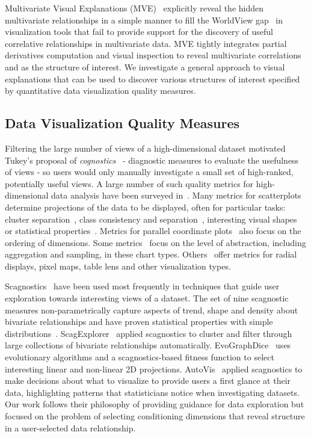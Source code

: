 Multivariate Visual Explanations (MVE)~\cite{Barlowe2008} explicitly reveal the hidden multivariate relationships in a simple manner to fill the WorldView gap~\cite{Amar2004} in visualization tools that fail to provide support for the discovery of useful correlative relationships in multivariate data. MVE tightly integrates partial derivatives computation and visual inspection to reveal multivariate correlations and as the structure of interest. We investigate a general approach to visual explanations that can be used to discover various structures of interest specified by quantitative data visualization quality measures.

\subsection{Data Visualization Quality Measures}
Filtering the large number of views of a high-dimensional dataset motivated Tukey's proposal of \textit{cognostics}~\cite{Tukey1982,Tukey1985} - diagnostic measures to evaluate the usefulness of views - so users would only manually investigate a small set of high-ranked, potentially useful views. A large number of such quality metrics for high-dimensional data analysis have been surveyed in~\cite{Bertini2011}.  Many metrics for scatterplots determine projections of the data to be displayed, often for particular tasks: cluster separation~\cite{Sedlmair2012, Tatu2009}, class consistency and separation~\cite{Sips2009, Schafer2013}, interesting visual shapes~\cite{Wilkinson2005} or statistical properties~\cite{Kandel2012, Seo2005, Piringer2008}. Metrics for parallel coordinate plots~\cite{Ankerst1998, Dasgupta2010, Johansson2009, Yang2003} also focus on the ordering of dimensions. Some metrics~\cite{Bertini2006, Cui2006} focus on the level of abstraction, including aggregation and sampling, in these chart types. Others~\cite{Albuquerque2010, Ankerst1998, Schneidewind2006, Yang2003} offer metrics for radial displays, pixel maps, table lens and other visualization types. 
	
Scagnostics~\cite{Wilkinson2005} have been used most frequently in techniques that guide user exploration towards interesting views of a dataset. The set of nine scagnostic measures non-parametrically capture aspects of trend, shape and density about bivariate relationships and have proven statistical properties with simple distributions~\cite{Wilkinson2008}. ScagExplorer~\cite{Dang2014} applied scagnostics to cluster and filter through large collections of bivariate relationships automatically. EvoGraphDice~\cite{Boukhelifa2013} uses evolutionary algorithms and a scagnostics-based fitness function to select interesting linear and non-linear 2D projections. AutoVis~\cite{Wills2010} applied scagnostics to make decisions about what to visualize to provide users a first glance at their data, highlighting patterns that statisticians notice when investigating datasets. Our work follows their philosophy of providing guidance for data exploration but focused on the problem of selecting conditioning dimensions that reveal structure in a user-selected data relationship. 

